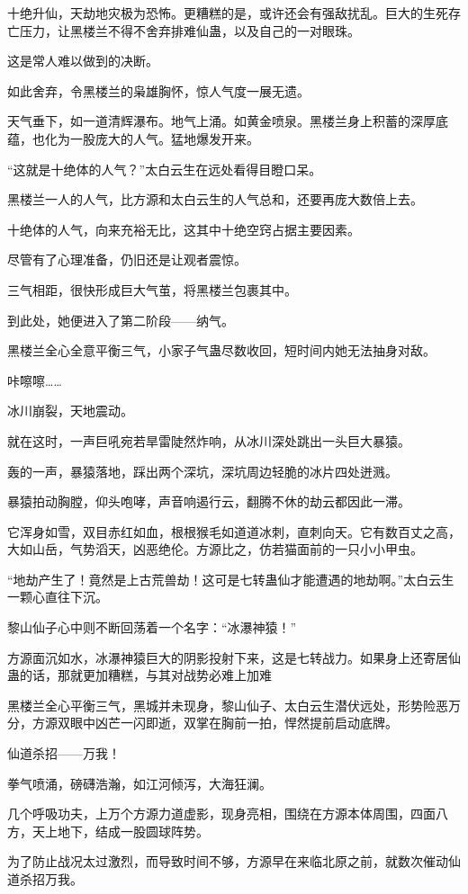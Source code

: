 \begin{this_body}
十绝升仙，天劫地灾极为恐怖。更糟糕的是，或许还会有强敌扰乱。巨大的生死存亡压力，让黑楼兰不得不舍弃排难仙蛊，以及自己的一对眼珠。

这是常人难以做到的决断。

如此舍弃，令黑楼兰的枭雄胸怀，惊人气度一展无遗。

天气垂下，如一道清辉瀑布。地气上涌。如黄金喷泉。黑楼兰身上积蓄的深厚底蕴，也化为一股庞大的人气。猛地爆发开来。

“这就是十绝体的人气？”太白云生在远处看得目瞪口呆。

黑楼兰一人的人气，比方源和太白云生的人气总和，还要再庞大数倍上去。

十绝体的人气，向来充裕无比，这其中十绝空窍占据主要因素。

尽管有了心理准备，仍旧还是让观者震惊。

三气相距，很快形成巨大气茧，将黑楼兰包裹其中。

到此处，她便进入了第二阶段——纳气。

黑楼兰全心全意平衡三气，小家子气蛊尽数收回，短时间内她无法抽身对敌。

咔嚓嚓……

冰川崩裂，天地震动。

就在这时，一声巨吼宛若旱雷陡然炸响，从冰川深处跳出一头巨大暴猿。

轰的一声，暴猿落地，踩出两个深坑，深坑周边轻脆的冰片四处迸溅。

暴猿拍动胸膛，仰头咆哮，声音响遏行云，翻腾不休的劫云都因此一滞。

它浑身如雪，双目赤红如血，根根猴毛如道道冰刺，直刺向天。它有数百丈之高，大如山岳，气势滔天，凶恶绝伦。方源比之，仿若猫面前的一只小小甲虫。

“地劫产生了！竟然是上古荒兽劫！这可是七转蛊仙才能遭遇的地劫啊。”太白云生一颗心直往下沉。

黎山仙子心中则不断回荡着一个名字：“冰瀑神猿！”

方源面沉如水，冰瀑神猿巨大的阴影投射下来，这是七转战力。如果身上还寄居仙蛊的话，那就更加糟糕，与其对战势必难上加难

黑楼兰全心平衡三气，黑城并未现身，黎山仙子、太白云生潜伏远处，形势险恶万分，方源双眼中凶芒一闪即逝，双掌在胸前一拍，悍然提前启动底牌。

仙道杀招——万我！

拳气喷涌，磅礴浩瀚，如江河倾泻，大海狂澜。

几个呼吸功夫，上万个方源力道虚影，现身亮相，围绕在方源本体周围，四面八方，天上地下，结成一股圆球阵势。

为了防止战况太过激烈，而导致时间不够，方源早在来临北原之前，就数次催动仙道杀招万我。


\end{this_body}
